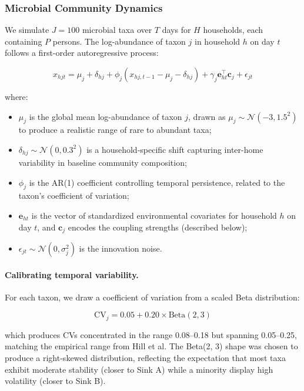 \documentclass[11pt,letterpaper]{article}
\begin{document}
\subsubsection{Microbial Community Dynamics}

We simulate $J = 100$ microbial taxa over $T$ days for $H$ households, each containing $P$ persons. The log-abundance of taxon $j$ in household $h$ on day $t$ follows a first-order autoregressive process:

\begin{equation}
    x_{hjt} = \mu_j + \delta_{hj} + \phi_j \left( x_{hj,t-1} - \mu_j - \delta_{hj} \right) + \gamma_j \mathbf{e}_{ht}^\top \mathbf{c}_j + \epsilon_{jt}
    \label{eq:ar1}
\end{equation}

\noindent where:
\begin{itemize}
    \item $\mu_j$ is the global mean log-abundance of taxon $j$, drawn as $\mu_j \sim \mathcal{N}(-3, 1.5^2)$ to produce a realistic range of rare to abundant taxa;
    \item $\delta_{hj} \sim \mathcal{N}(0, 0.3^2)$ is a household-specific shift capturing inter-home variability in baseline community composition;
    \item $\phi_j$ is the AR(1) coefficient controlling temporal persistence, related to the taxon's coefficient of variation;
    \item $\mathbf{e}_{ht}$ is the vector of standardized environmental covariates for household $h$ on day $t$, and $\mathbf{c}_j$ encodes the coupling strengths (described below);
    \item $\epsilon_{jt} \sim \mathcal{N}(0, \sigma_j^2)$ is the innovation noise.
\end{itemize}

\paragraph{Calibrating temporal variability.} For each taxon, we draw a coefficient of variation from a scaled Beta distribution:

\begin{equation}
    \text{CV}_j = 0.05 + 0.20 \times \text{Beta}(2, 3)
\end{equation}

\noindent which produces CVs concentrated in the range 0.08--0.18 but spanning 0.05--0.25, matching the empirical range from Hill et al. The Beta(2, 3) shape was chosen to produce a right-skewed distribution, reflecting the expectation that most taxa exhibit moderate stability (closer to Sink A) while a minority display high volatility (closer to Sink B).
\end{document}
